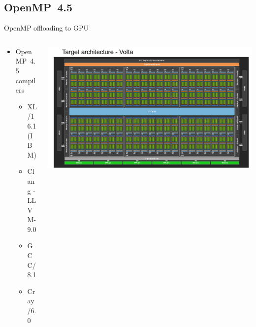 \documentclass[xcolor=dvipsnames,compress,10pt]{nersc}
\begin{document}
\subsection{OpenMP~4.5 }
\begin{frame}[fragile] {OpenMP offloading to GPU}
\begin{center}
\end{center}
\begin{columns}[t]
\begin{column}{.38\textwidth}
\begin{itemize}
    \setlength\itemsep{1.5em}
    \item OpenMP~4.5 compilers
    \begin{itemize}
        \item XL/16.1(IBM)
        \item Clang - LLVM-9.0
        \item GCC/8.1
        \item Cray/6.0
    \end{itemize}
\end{itemize}
\end{column}
\begin{column}{.58\textwidth}
\begin{center}
\includegraphics[width=\linewidth]{images/volta_architecture.png}
\end{center}
\end{column}
\end{columns}
\end{frame}


\end{document}
